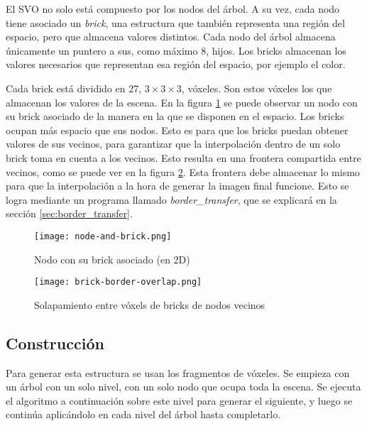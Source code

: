 El SVO no solo está compuesto por los nodos del árbol.
A su vez, cada nodo tiene asociado un \textit{brick}, una estructura que también representa una región del espacio, pero que almacena valores distintos.
Cada nodo del árbol almacena únicamente un puntero a sus, como máximo $8$, hijos.
Los bricks almacenan los valores necesarios que representan esa región del espacio, por ejemplo el color.

Cada brick está dividido en 27, $3\times3\times3$, vóxeles.
Son estos vóxeles los que almacenan los valores de la escena.
En la figura \ref{fig:node_and_brick} se puede observar un nodo con su brick asociado de la manera en la que se disponen en el espacio.
Los bricks ocupan más espacio que sus nodos.
Esto es para que los bricks puedan obtener valores de sus vecinos, para garantizar que la interpolación dentro de un solo brick toma en cuenta a los vecinos.
Esto resulta en una frontera compartida entre vecinos, como se puede ver en la figura \ref{fig:brick_border_overlap}.
Esta frontera debe almacenar lo mismo para que la interpolación a la hora de generar la imagen final funcione.
Esto se logra mediante un programa llamado \textit{border\_transfer}, que se explicará en la sección \ref{sec:border_transfer}.


\begin{figure}[h!]
    \centering
    \texttt{[image: node-and-brick.png]}
    \caption{Nodo con su brick asociado (en 2D)}
    \label{fig:node_and_brick}
\end{figure}

\begin{figure}[h!]
    \centering
    \texttt{[image: brick-border-overlap.png]}
    \caption{Solapamiento entre vóxels de bricks de nodos vecinos}
    \label{fig:brick_border_overlap}
\end{figure}

\subsection{Construcción}\label{design:svo_construction}

Para generar esta estructura se usan los fragmentos de vóxeles.
Se empieza con un árbol con un solo nivel, con un solo nodo que ocupa toda la escena.
Se ejecuta el algoritmo a continuación sobre este nivel para generar el siguiente, y luego se continúa aplicándolo en cada nivel del árbol hasta completarlo.

